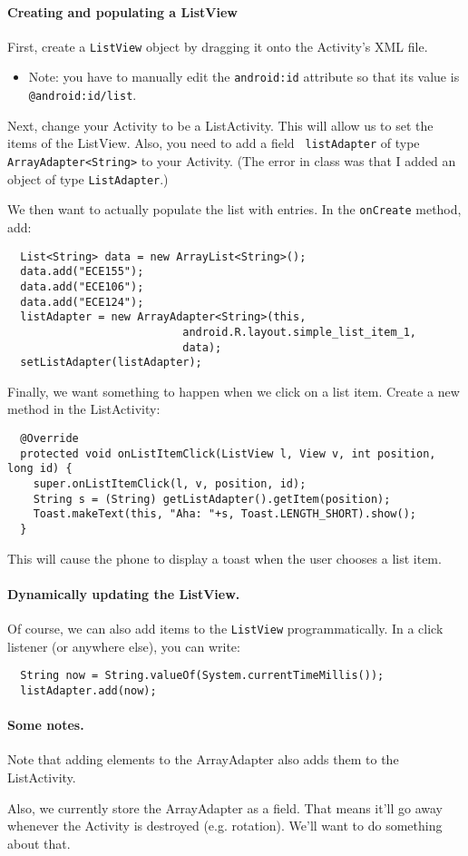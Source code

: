 \paragraph{Creating and populating a ListView} 
First, create a {\tt ListView} object by dragging it onto the Activity's
XML file.
\begin{itemize}
\item Note: you have to manually edit the {\tt android:id} attribute so
that its value is \verb+@android:id/list+.
\end{itemize}
Next, change your Activity to be a ListActivity. This will allow us to
set the items of the ListView. Also, you need to add a field {\tt
  listAdapter} of type \verb+ArrayAdapter<String>+ to your Activity.
(The error in class was that I added an object of type {\tt ListAdapter}.)

We then want to actually populate the list with entries. In the 
{\tt onCreate} method, add:
\begin{lstlisting}
  List<String> data = new ArrayList<String>();
  data.add("ECE155");
  data.add("ECE106");
  data.add("ECE124");
  listAdapter = new ArrayAdapter<String>(this,
                           android.R.layout.simple_list_item_1,
                           data);
  setListAdapter(listAdapter);
\end{lstlisting}

Finally, we want something to happen when we click on a list item.
Create a new method in the ListActivity:
\begin{lstlisting}
  @Override
  protected void onListItemClick(ListView l, View v, int position, long id) {
    super.onListItemClick(l, v, position, id);
    String s = (String) getListAdapter().getItem(position);
    Toast.makeText(this, "Aha: "+s, Toast.LENGTH_SHORT).show();
  }
\end{lstlisting}
This will cause the phone to display a toast when the user chooses a list item.

\paragraph{Dynamically updating the ListView.} Of course, we can also
add items to the {\tt ListView} programmatically. In a click listener (or
anywhere else), you can write:
\begin{lstlisting}
  String now = String.valueOf(System.currentTimeMillis());
  listAdapter.add(now);
\end{lstlisting}

\paragraph{Some notes.} Note that adding elements to the ArrayAdapter also adds them to the ListActivity.

Also, we currently store the ArrayAdapter as a field.
That means it'll go away whenever the Activity is destroyed (e.g.
rotation). We'll want to do something about that.



